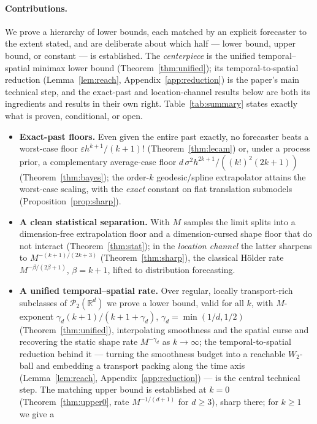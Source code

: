 \documentclass[11pt]{article}
\theoremstyle{definition}
\theoremstyle{remark}
\newcommand{\R}{\mathbb{R}}
\newcommand{\PP}{\mathcal{P}_2(\R^d)}
\begin{document}
\paragraph{Contributions.} We prove a hierarchy of lower bounds, each matched by an explicit
forecaster to the extent stated, and are deliberate about which half --- lower bound, upper
bound, or constant --- is established. The \emph{centerpiece} is the unified temporal--spatial
minimax lower bound (Theorem~\ref{thm:unified}); its temporal-to-spatial reduction
(Lemma~\ref{lem:reach}, Appendix~\ref{app:reduction}) is the paper's main technical step, and the
exact-past and location-channel results below are both its ingredients and results in their own
right. Table~\ref{tab:summary} states exactly what is proven, conditional, or open.
\begin{itemize}
\item \textbf{Exact-past floors.} Even given the entire past exactly, no forecaster beats a
worst-case floor $\varepsilon h^{k+1}/(k+1)!$ (Theorem~\ref{thm:lecam}) or, under a process
prior, a complementary average-case floor $d\,\sigma^2 h^{2k+1}/((k!)^2(2k+1))$
(Theorem~\ref{thm:bayes}); the order-$k$ geodesic/spline extrapolator attains the worst-case
scaling, with the \emph{exact} constant on flat translation submodels
(Proposition~\ref{prop:sharp}).
\item \textbf{A clean statistical separation.} With $M$ samples the limit splits into a
dimension-free extrapolation floor and a dimension-cursed shape floor that do not interact
(Theorem~\ref{thm:stat}); in the \emph{location channel} the latter sharpens to
$M^{-(k+1)/(2k+3)}$ (Theorem~\ref{thm:sharp}), the classical H\"older rate
$M^{-\beta/(2\beta+1)}$, $\beta=k+1$, lifted to distribution forecasting.
\item \textbf{A unified temporal--spatial rate.} Over regular, locally transport-rich subclasses of $\PP$ we prove a lower bound, valid for all
$k$, with $M$-exponent $\gamma_d(k+1)/(k+1+\gamma_d)$, $\gamma_d=\min(1/d,1/2)$
(Theorem~\ref{thm:unified}), interpolating smoothness and the spatial curse and recovering the
static shape rate $M^{-\gamma_d}$ as $k\to\infty$; the temporal-to-spatial reduction behind it ---
turning the smoothness budget into a reachable $W_2$-ball and embedding a transport packing along
the time axis (Lemma~\ref{lem:reach}, Appendix~\ref{app:reduction}) --- is the central technical
step. The matching upper bound is established at $k=0$
(Theorem~\ref{thm:upper0}, rate $M^{-1/(d+1)}$ for $d\ge3$), sharp there; for $k\ge1$ we give a

\end{itemize}
\end{document}
